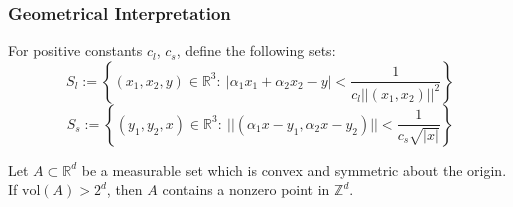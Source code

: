 \documentclass[aspectratio=1610]{beamer}
\begin{document}
\begin{frame}
    \frametitle{Geometrical Interpretation}
    For positive constants $c_l$, $c_s$, define the following sets:
    \[S_l := \left\{(x_1,x_2, y)\in \mathbb{R}^3:\ |\alpha_1x_1 + \alpha_2x_2-y| < \frac{1}{c_l||(x_1,x_2)||^2}\right\}\]
    \[S_s := \left\{(y_1, y_2, x)\in \mathbb{R}^3: \ ||(\alpha_1x - y_1, \alpha_2x-y_2)|| < \frac{1}{c_s\sqrt{|x|}}\right\}\]
    \begin{theorem}[Minkowski]
        Let $A \subset \mathbb{R}^d$ be a measurable set which is convex and symmetric about the origin. If $\mathrm{vol}(A)>2^d$, then $A$ contains a nonzero point in $\mathbb{Z}^d$.
    \end{theorem}

\end{frame}
\end{document}
